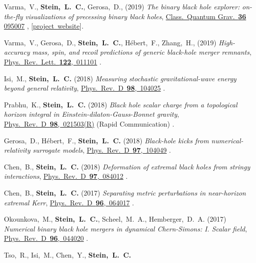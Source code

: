 \begin{etaremune}[start=\value{pubCounter}]
  Varma,~V., {\bf Stein,~L.~C.}, Gerosa,~D.,
  (2019)
  {\it The binary black hole explorer: on-the-fly visualizations of precessing binary black holes},
  \href{https://doi.org/10.1088/1361-6382/ab0ee9}{Class.~Quantum Grav.~{\bf 36} 095007}
  ,
  [\href{https://vijayvarma392.github.io/binaryBHexp/}{project~website}].
\item
  Varma,~V., Gerosa,~D., {\bf Stein,~L.~C.}, H\'ebert,~F.,  Zhang,~H.,
  (2019)
  {\it High-accuracy mass, spin, and recoil predictions of generic black-hole merger remnants},
  \href{https://doi.org/10.1103/PhysRevLett.122.011101}{Phys.~Rev.~Lett.~{\bf 122},~011101}
  .
 \item
  Isi,~M., {\bf Stein,~L.~C.}
  (2018)
  {\it Measuring stochastic gravitational-wave energy beyond general relativity},
  \href{https://doi.org/10.1103/PhysRevD.98.104025}{Phys.~Rev.~D~{\bf 98},~104025}
  .
\item
  Prabhu,~K., {\bf Stein,~L.~C.}
  (2018)
  {\it Black hole scalar charge from a topological horizon integral in
    Einstein-dilaton-Gauss-Bonnet gravity},
  \href{https://doi.org/10.1103/PhysRevD.98.021503}{Phys.~Rev.~D~{\bf 98},~021503(R)}
  (Rapid Communication)
  .
\item
  Gerosa,~D., H\'ebert,~F., {\bf Stein,~L.~C.}
  (2018)
  {\it Black-hole kicks from numerical-relativity surrogate models},
  \href{https://doi.org/10.1103/PhysRevD.97.104049}{Phys.~Rev.~D~{\bf 97},~104049}
  .
\item
  Chen,~B., {\bf Stein,~L.~C.}
  (2018)
  {\it Deformation of extremal black holes from stringy interactions},
  \href{https://doi.org/10.1103/PhysRevD.97.084012}{Phys.~Rev.~D~{\bf 97},~084012}
  .
\item
  Chen,~B., {\bf Stein,~L.~C.}
  (2017)
  {\it Separating metric perturbations in near-horizon extremal Kerr},
  \href{https://doi.org/10.1103/PhysRevD.96.064017}{Phys.~Rev.~D~{\bf 96},~064017}
  .
\item
  Okounkova,~M.,
  {\bf Stein,~L.~C.},
  Scheel,~M.~A.,
  Hemberger,~D.~A.
  (2017)
  {\it Numerical binary black hole mergers in dynamical Chern-Simons:
    I. Scalar field},
  \href{https://doi.org/10.1103/PhysRevD.96.044020}{Phys.~Rev.~D~{\bf 96},~044020}
  .
\item
  Tso,~R., Isi,~M., Chen,~Y., {\bf Stein,~L.~C.}

\end{etaremune}
